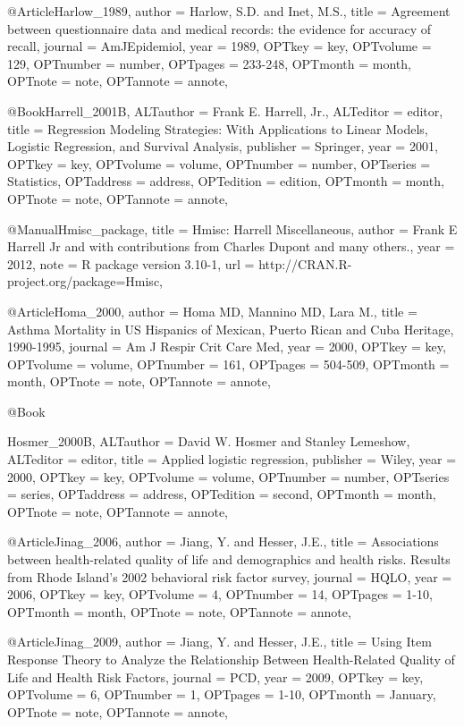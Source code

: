 {{@Article{Harlow_1989,
author = {Harlow, S.D. and Inet, M.S.},
title = {Agreement between questionnaire data and medical records: the evidence for accuracy of recall},
journal = {AmJEpidemiol},
year = {1989},
OPTkey = {key},
OPTvolume = {129},
OPTnumber = {number},
OPTpages = {233-248},
OPTmonth = {month},
OPTnote = {note},
OPTannote = {annote},
}

@Book{Harrell_2001B,
ALTauthor = {{Frank E. Harrell, Jr.}},
ALTeditor = {editor},
title = {Regression Modeling Strategies: With Applications to Linear Models, Logistic Regression, and Survival Analysis},
publisher = {Springer},
year = {2001},
OPTkey = {key},
OPTvolume = {volume},
OPTnumber = {number},
OPTseries = {Statistics},
OPTaddress = {address},
OPTedition = {edition},
OPTmonth = {month},
OPTnote = {note},
OPTannote = {annote},
}


@Manual{Hmisc_package,
    title = {Hmisc: Harrell Miscellaneous},
    author = {Frank E Harrell Jr and with contributions from Charles Dupont and many others.},
    year = {2012},
    note = {R package version 3.10-1},
    url = {http://CRAN.R-project.org/package=Hmisc},
  }


@Article{Homa_2000,
author = {Homa MD, Mannino MD, Lara M.},
title = {Asthma Mortality in US Hispanics of Mexican, Puerto Rican and Cuba Heritage, 1990-1995},
journal = {Am J Respir Crit Care Med},
year = {2000},
OPTkey = {key},
OPTvolume = {volume},
OPTnumber = {161},
OPTpages = {504-509},
OPTmonth = {month},
OPTnote = {note},
OPTannote = {annote},
}


@Book{Hosmer_2000B,
ALTauthor = {{David W. Hosmer} and {{Stanley Lemeshow}},
ALTeditor = {editor},
title = {Applied logistic regression},
publisher = {Wiley},
year = {2000},
OPTkey = {key},
OPTvolume = {volume},
OPTnumber = {number},
OPTseries = {series},
OPTaddress = {address},
OPTedition = {second},
OPTmonth = {month},
OPTnote = {note},
OPTannote = {annote},
}



@Article{Jinag_2006,
author = {Jiang, Y. and Hesser, J.E.},
title = {Associations between health-related quality of life and demographics and health risks. Results from Rhode Island's 2002 behavioral risk factor survey},
journal = {HQLO},
year = {2006},
OPTkey = {key},
OPTvolume = {4},
OPTnumber = {14},
OPTpages = {1-10},
OPTmonth = {month},
OPTnote = {note},
OPTannote = {annote},
}


@Article{Jinag_2009,
author = {Jiang, Y. and Hesser, J.E.},
title = {Using Item Response Theory to Analyze the Relationship Between Health-Related Quality of Life and Health Risk Factors},
journal = {PCD},
year = {2009},
OPTkey = {key},
OPTvolume = {6},
OPTnumber = {1},
OPTpages = {1-10},
OPTmonth = {January},
OPTnote = {note},
OPTannote = {annote},
}

}}}

